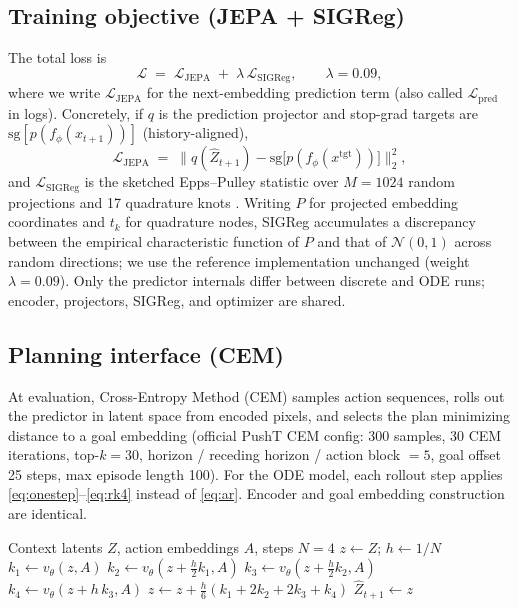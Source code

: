 \subsection{Training objective (JEPA + SIGReg)}
\label{sec:loss}

The total loss is
\begin{equation}
  \mathcal{L}
  \;=\;
  \mathcal{L}_{\mathrm{JEPA}}
  \;+\;
  \lambda\,\mathcal{L}_{\mathrm{SIGReg}},
  \qquad
  \lambda = 0.09,
  \label{eq:loss}
\end{equation}
where we write $\mathcal{L}_{\mathrm{JEPA}}$ for the next-embedding
prediction term (also called $\mathcal{L}_{\mathrm{pred}}$ in logs).
Concretely, if $q$ is the prediction projector and stop-grad targets
are $\mathrm{sg}[p(f_\phi(x_{t+1}))]$ (history-aligned),
\begin{equation}
  \mathcal{L}_{\mathrm{JEPA}}
  \;=\;
  \bigl\|
    q(\hat Z_{t+1}) - \mathrm{sg}\bigl[p(f_\phi(x^{\mathrm{tgt}}))\bigr]
  \bigr\|_2^{2},
  \label{eq:jepa}
\end{equation}
and $\mathcal{L}_{\mathrm{SIGReg}}$ is the sketched Epps--Pulley
statistic over $M{=}1024$ random projections and 17 quadrature knots
\cite{balestriero2025lejepa,maes2026lewm}.
Writing $P$ for projected embedding coordinates and $t_k$ for
quadrature nodes, SIGReg accumulates a discrepancy between the
empirical characteristic function of $P$ and that of
$\mathcal{N}(0,1)$ across random directions; we use the reference
implementation unchanged (weight $\lambda{=}0.09$).
Only the predictor internals differ between discrete and ODE runs;
encoder, projectors, SIGReg, and optimizer are shared.

\subsection{Planning interface (CEM)}
\label{sec:cem}

At evaluation, Cross-Entropy Method (CEM) samples action sequences,
rolls out the predictor in latent space from encoded pixels, and
selects the plan minimizing distance to a goal embedding (official
PushT CEM config: 300 samples, 30 CEM iterations, top-$k{=}30$,
horizon / receding horizon / action block $=5$, goal offset 25
steps, max episode length 100).
For the ODE model, each rollout step applies
\eqref{eq:onestep}--\eqref{eq:rk4} instead of \eqref{eq:ar}.
Encoder and goal embedding construction are identical.

\begin{algorithm}[t]
\caption{ODE one-step prediction (training \& CEM rollout)}
\label{alg:ode-step}
\begin{algorithmic}[1]
\Require Context latents $Z$, action embeddings $A$, steps $N{=}4$
\State $z \gets Z$;\; $h \gets 1/N$
  \State $k_1 \gets v_\theta(z, A)$
  \State $k_2 \gets v_\theta(z + \tfrac{h}{2}k_1, A)$
  \State $k_3 \gets v_\theta(z + \tfrac{h}{2}k_2, A)$
  \State $k_4 \gets v_\theta(z + h\,k_3, A)$
  \State $z \gets z + \tfrac{h}{6}(k_1+2k_2+2k_3+k_4)$
\EndFor
\State \Return $\hat Z_{t+1} \gets z$ 
\end{algorithmic}
\end{algorithm}

